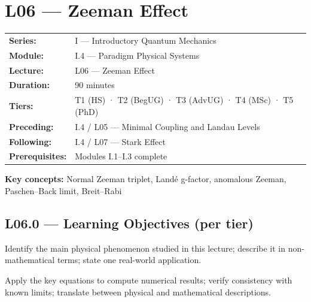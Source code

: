 \renewcommand{\lectureCode}{I.4 / L06}

\section*{L06 — Zeeman Effect}
\label{sec:L06}

\begin{tcolorbox}[lecturebox, title={Module I.4 / L06 — Metadata}]
\begin{tabular}{@{}ll@{}}
\textbf{Series:}    & I — Introductory Quantum Mechanics \\
\textbf{Module:}    & I.4 — Paradigm Physical Systems \\
\textbf{Lecture:}   & L06 — Zeeman Effect \\
\textbf{Duration:}  & 90 minutes \\
\textbf{Tiers:}     & T1 (HS) · T2 (BegUG) · T3 (AdvUG) · T4 (MSc) · T5 (PhD) \\
\textbf{Preceding:} & I.4 / L05 — Minimal Coupling and Landau Levels \\
\textbf{Following:} & I.4 / L07 — Stark Effect \\
\textbf{Prerequisites:} & Modules I.1–I.3 complete \\
\end{tabular}

\medskip
\textbf{Key concepts:} Normal Zeeman triplet, Landé g-factor, anomalous Zeeman, Paschen–Back limit, Breit–Rabi
\end{tcolorbox}

\subsection*{L06.0 — Learning Objectives (per tier)}
\label{sec:L06.0}

\quad
Identify the main physical phenomenon studied in this lecture; describe it in
non-mathematical terms; state one real-world application.

\quad
Apply the key equations to compute numerical results; verify consistency with
known limits; translate between physical and mathematical descriptions.

